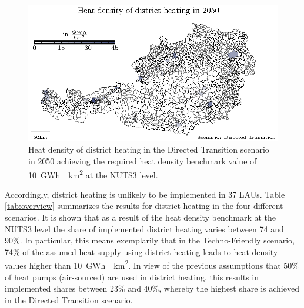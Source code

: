 \begin{figure}[h]
	\centering
	\includegraphics[width=1\linewidth]{figures/austria-heat-density/austria-laus.eps}
	\caption{Heat density of district heating in the Directed Transition scenario in 2050 achieving the required heat density benchmark value of \SI{10}{GWh \per km^2} at the NUTS3 level.}
	\label{fig:4}
\end{figure}

Accordingly, district heating is unlikely to be implemented in 37 LAUs. Table \ref{tab:overview} summarizes the results for district heating in the four different scenarios. It is shown that as a result of the heat density benchmark at the NUTS3 level the share of implemented district heating varies between 74 and 90\%. In particular, this means exemplarily that in the Techno-Friendly scenario, 74\% of the assumed heat supply using district heating leads to heat density values higher than \SI{10}{GWh \per km^2}. In view of the previous assumptions that 50\% of heat pumps (air-sourced) are used in district heating, this results in implemented shares between 23\% and 40\%, whereby the highest share is achieved in the Directed Transition scenario. 




